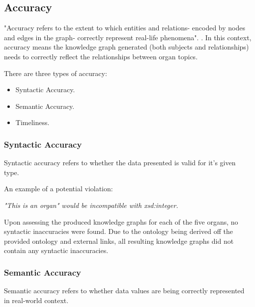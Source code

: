 \subsection{Accuracy}
\hspace{0.5cm} "Accuracy refers to the extent to which entities and relations- encoded by nodes and edges in the graph- correctly represent real-life phenomena". \cite{knowledgegraphevaulationbook}. In this context, accuracy means the knowledge graph generated (both subjects and relationships) needs to correctly reflect the relationships between organ topics. 

There are three types of accuracy: 

\vspace{-0.2cm}
\begin{itemize}
    \itemsep0em 
\item Syntactic Accuracy.
\vspace{-0.1cm}
\item Semantic Accuracy.
\vspace{-0.1cm}
\item Timeliness.
\end{itemize}
\vspace{-0.4cm}

\subsubsection{Syntactic Accuracy}
\hspace{0.5cm} Syntactic accuracy refers to whether the data presented is valid for it's given type. \cite{knowledgegraphevaulationbook}

\noindent An example of a potential violation: 
\begin{displayquote}
    \textit{"This is an organ" would be incompatible with xsd:integer.}
\end{displayquote}

Upon assessing the produced knowledge graphs for each of the five organs, no syntactic inaccuracies were found. Due to the ontology being derived off the provided ontology and external links, all resulting knowledge graphs did not contain any syntactic inaccuracies. 

\subsubsection{Semantic Accuracy}
\hspace{0.5cm} Semantic accuracy refers to whether data values are being correctly represented in real-world context. \cite{knowledgegraphevaulationbook}

